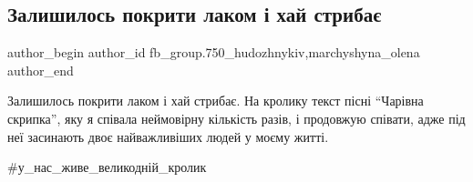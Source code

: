  
 
 
 
 

\subsection{Залишилось покрити лаком і хай стрибає}
\label{sec:29_03_2018.fb.fb_group.750_hudozhnykiv.2.zalyshylos_pokryty_lakom_i_haj_strybaje}
 
\ifcmt
 author_begin
   author_id fb_group.750_hudozhnykiv,marchyshyna_olena
 author_end
\fi

Залишилось покрити лаком і хай стрибає. На кролику текст пісні \enquote{Чарівна
скрипка}, яку я співала неймовірну кількість разів, і продовжую співати, адже
під неї засинають двоє найважливіших людей у моєму житті.

\#у\_нас\_живе\_великодній\_кролик

